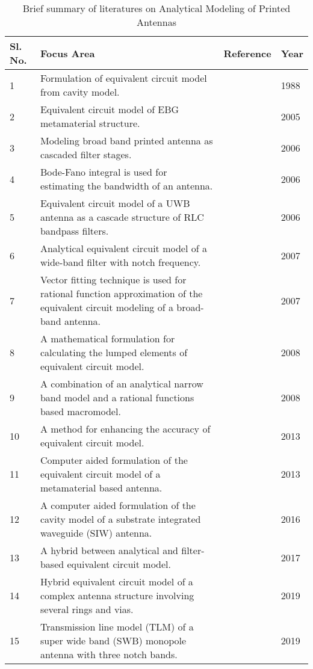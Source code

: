 \begin{table*}[]
\caption{Brief summary of literatures on Analytical Modeling of Printed Antennas}
\label{tab_litsurv_2}
\setlength\extrarowheight{-6pt}
\begin{tabular}{|p{}|p{}|p{}|p{}|}
\toprule
Sl. No. & Focus Area & Reference & Year \\ \midrule
1 &  Formulation of equivalent circuit model from cavity model. & \cite{RectEqCkt-der} & 1988 \\ \hline
2 &  Equivalent circuit model of EBG metamaterial structure. & \cite{mtm_ebg_eqckt2} & 2005 \\ \hline
3 &  Modeling broad band printed antenna as cascaded filter stages. & \cite{Broadband_EqCkt} & 2006 \\ \hline
4 &  Bode-Fano integral is used for estimating the bandwidth of an antenna. & \cite{Fano_BW_Antenna} & 2006 \\ \hline
5 &  Equivalent circuit model of a UWB antenna as a cascade structure of RLC bandpass filters. & \cite{UwbEqCktMethod} & 2006 \\ \hline
6 &  Analytical equivalent circuit model of a wide-band filter with notch frequency. & \cite{UwbNotchEqCkt} & 2007 \\ \hline
7 &  Vector fitting technique is used for rational function approximation of the equivalent circuit modeling of a broad-band antenna. & \cite{comp-aided-eqckt} & 2007 \\ \hline
8 &  A mathematical formulation for calculating the lumped elements of equivalent circuit model. & \cite{rectEqCkt} & 2008 \\ \hline
9 &  A combination of an analytical narrow band model and a rational functions based macromodel. & \cite{UwbPmaEqCkt1} & 2008 \\ \hline
10 &  A method for enhancing the accuracy of equivalent circuit model. & \cite{UwbPmaEqCkt2} & 2013 \\ \hline
11 &  Computer aided formulation of the equivalent circuit model of a metamaterial based antenna. & \cite{UwbPmaEqCkt3} & 2013 \\ \hline
12 &  A computer aided formulation of the cavity model of a substrate integrated waveguide (SIW) antenna. & \cite{comp-aided-eqckt2} & 2016 \\ \hline
13 &  A hybrid between analytical and filter-based equivalent circuit model. & \cite{UwbPmaEqCkt4} & 2017 \\ \hline
14 &  Hybrid equivalent circuit model of a complex antenna structure involving several rings and vias. & \cite{ana_eqckt_ex1} & 2019 \\ \hline
15 &  Transmission line model (TLM) of a super wide band (SWB) monopole antenna with three notch bands. & \cite{optEqCkt_ads} & 2019 \\ \bottomrule

\end{tabular}%
\end{table*}

